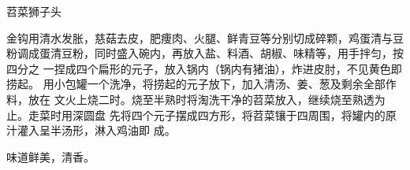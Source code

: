 \begin{recipe}{苕菜狮子头}

\ingredients


\preparation

\step 金钩用清水发胀，慈菇去皮，肥痩肉、火腿、鲜青豆等分别切成碎颗，鸡蛋清与豆
粉调成蛋清豆粉，同时盛入碗内，再放入盐、料酒、胡椒、味精等，用手拌匀，按四分之
一捏成四个扁形的元子，放入锅内（锅内有猪油），炸进皮肘，不见黄色即捞起。
\step 用小包罐一个洗净，将捞起的元子放下，加入清汤、姜、葱及剩余全部作料，放在
文火上烧二时。烧至半熟时将淘洗干净的苕菜放入，继续烧至熟透为止。走菜时用深圆盘
先将四个元子摆成四方形，将苕菜镶于四周围，将罐内的原汁灌入呈半汤形，淋入鸡油即
成。

\features

味道鲜美，清香。

\end{recipe}

